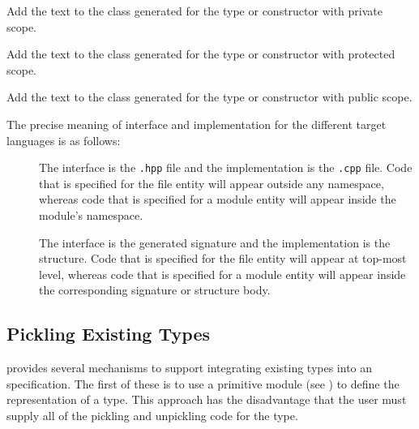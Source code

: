 \begin{description}
    Add the text to the class generated for the type or constructor with private scope.

    Add the text to the class generated for the type or constructor with protected scope.

     Add the text to the class generated for the type or constructor with public scope.

\end{description}%

The precise meaning of interface and implementation for the different
target languages is as follows:
\begin{description}
  \item[\Cplusplus{}]
    The interface is the \texttt{.hpp} file and the implementation is the \texttt{.cpp}
    file.
    Code that is specified for the file entity will appear outside any namespace, whereas
    code that is specified for a module entity will appear inside the module's namespace.
  \item[\sml{}]
    The interface is the generated signature and the implementation is the structure.
    Code that is specified for the file entity will appear at top-most level, whereas code
    that is specified for a module entity will appear inside the corresponding signature
    or structure body.
\end{description}%

\subsection{Pickling Existing Types}

\asdlgen{} provides several mechanisms to support integrating existing
\sml{} types into an \asdl{} specification.
The first of these is to use a primitive module (see )
to define the representation of a type.
This approach has the disadvantage that the user must supply all of the
pickling and unpickling code for the type.

